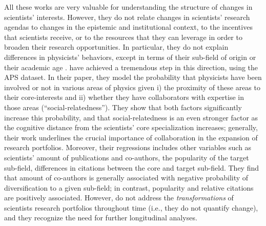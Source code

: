 \documentclass{article}
\begin{document}
All these works are very valuable for understanding the structure of changes in scientists' interests. %
However, they do not relate changes in scientists' research agendas to changes in the epistemic and institutional context, to the incentives that scientists receive, or to the resources that they can leverage in order to broaden their research opportunities. In particular, they do not explain differences in physicists' behaviors, except in terms of their sub-field of origin or their academic age \citep{Zeng2019,Aleta2019}. \citet{Tripodi2020} have achieved a tremendous step in this direction, using the APS dataset. In their paper, they model the probability that physicists have been involved or not in various areas of physics given i) the proximity of these areas to their core-interests and ii) whether they have collaborators with expertise in those areas (``social-relatedness''). They show that both factors significantly increase this probability, and that social-relatedness is an even stronger factor as the cognitive distance from the scientists' core specialization increases; generally, their work underlines the crucial importance of collaboration in the expansion of research portfolios. Moreover, their regressions includes other variables such as scientists' amount of publications and co-authors, the popularity of the target sub-field, differences in citations between the core and target sub-field. They find that amount of co-authors is generally associated with negative probability of diversification to a given sub-field; in contrast, popularity and relative citations are positively associated. However, \citeauthor{Tripodi2020} do not address the \textit{transformations} of scientists research portfolios throughout time (i.e., they do not quantify change), and they recognize the need for further longitudinal analyses.
\end{document}
